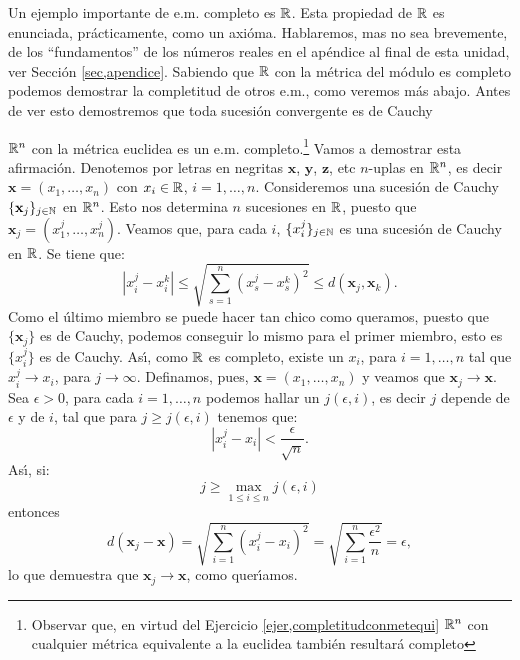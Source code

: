 Un ejemplo importante de e.m. completo es $\rr$. Esta propiedad de
$\rr$ es enunciada, pr\'acticamente, como un axi\'oma. Hablaremos,
mas no sea brevemente, de los ``fundamentos'' de los
 n\'umeros reales en el ap\'endice al final de esta unidad, ver
 Secci\'on  \vref{sec,apendice}. Sabiendo que $\rr$ con la
 m\'etrica del m\'odulo es completo podemos demostrar la
 completitud de otros e.m., como veremos m\'as abajo. Antes de ver
 esto demostremos que toda sucesi\'on convergente es de Cauchy

 \begin{ejemplo} $\rr^n$ con la m\'etrica euclidea es un e.m.
 completo.\footnote{Observar que, en virtud del Ejercicio
 \vref{ejer,completitudconmetequi} $\rr^n$ con cualquier
 m\'etrica equivalente a la euclidea tambi\'en resultar\'a
 completo} Vamos a demostrar esta afirmaci\'on. Denotemos
 por letras en negritas $\mathbf{x}$, $\mathbf{y}$, $\mathbf{z}$,
 etc $n$-uplas en $\rr^n$, es decir $\mathbf{x}=(x_1,\dots, x_n)$
 con $x_i\in\rr$, $i=1,\dots,n$. Consideremos una sucesi\'on de
 Cauchy  $\{\mathbf{x}_j\}_{j\in\nn}$ en $\rr^n$. Esto nos determina $n$
 sucesiones en $\rr$, puesto que
 $\mathbf{x}_j=(x_1^j,\dots,x_n^j)$. Veamos que, para cada $i$,
 $\{x_i^j\}_{j\in\nn}$ es una sucesi\'on de Cauchy en $\rr$. Se
 tiene que:
\[
    |x_i^j-x_i^k|\leq \sqrt{\sum\limits_{s=1}^n(x_s^j-x_s^k)^2}\leq
    d(\mathbf{x}_j,\mathbf{x}_k).
\]
Como el \'ultimo miembro se puede hacer tan chico como queramos,
puesto que $\{\mathbf{x}_j\}$ es de Cauchy, podemos conseguir lo
mismo para el primer miembro, esto es $\{x_i^j\}$ es de Cauchy.
As\'{\i}, como $\rr$ es completo, existe un $x_i$, para
$i=1,\dots,n$ tal que $x_i^j\rightarrow x_i$, para
$j\rightarrow\infty$. Definamos, pues,
$\mathbf{x}=(x_1,\dots,x_n)$ y veamos que $\mathbf{x}_j\rightarrow
\mathbf{x}$. Sea $\epsilon>0$, para cada $i=1,\dots,n$ podemos
hallar un $j(\epsilon,i)$, es decir $j$ depende de $\epsilon $ y
de $i$, tal que para $j\geq j(\epsilon, i)$ tenemos que:
\[
    |x_i^j-x_i|<\frac{\epsilon}{\sqrt{n}}.
\]
As\'{\i}, si:
\[
    j\geq\max\limits_{1\leq i\leq n}j(\epsilon,i)
\]
entonces
\[
    d(\mathbf{x}_j-\mathbf{x})=\sqrt{\sum\limits_{i=1}^n(x_i^j-x_i)^2}=
    \sqrt{\sum\limits_{i=1}^n\frac{\epsilon^2}{n}}=\epsilon,
\]
lo que demuestra que $\mathbf{x}_j\rightarrow \mathbf{x}$, como
quer\'{\i}amos.
\end{ejemplo}

